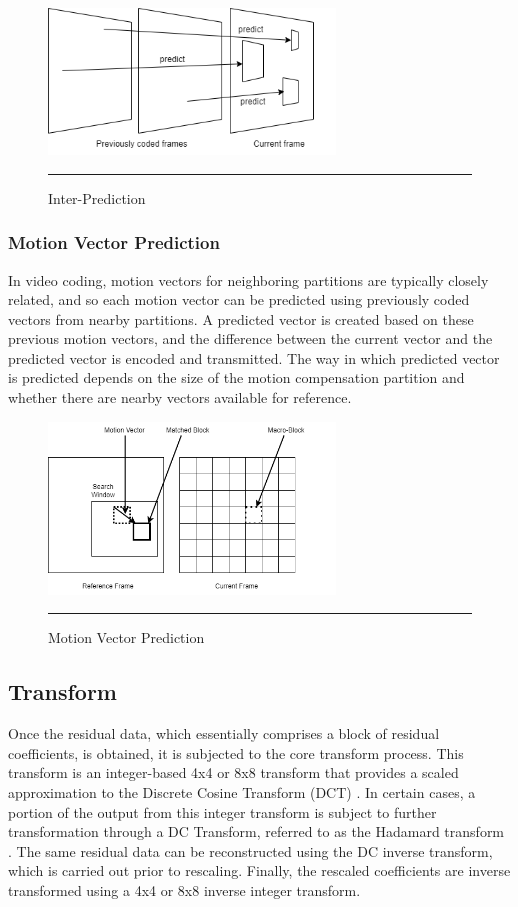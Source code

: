 \begin{figure}[htbp]
	\centering
	\includegraphics[width = 3in]{./Figures/interprediction.png}
	\rule{35em}{0.5pt}
	\caption{Inter-Prediction}
	\label{fig:interprediction}
\end{figure}

\subsubsection{Motion Vector Prediction}
In video coding, motion vectors for neighboring partitions are typically closely related, and so each motion vector can be predicted using previously coded vectors from nearby partitions. A predicted vector is created based on these previous motion vectors, and the difference between the current vector and the predicted vector is encoded and transmitted. The way in which predicted vector is predicted depends on the size of the motion compensation partition and whether there are nearby vectors available for reference.

\begin{figure}[htbp]
	\centering
	\includegraphics[width = 3in]{./Figures/motionvector.png}
	\rule{35em}{0.5pt}
	\caption{Motion Vector Prediction}
	\label{fig:motionvector}
\end{figure}

\subsection{Transform}
Once the residual data, which essentially comprises a block of residual coefficients, is obtained, it is subjected to the core transform process. This transform is an integer-based 4x4 or 8x8 transform that provides a scaled approximation to the Discrete Cosine Transform (DCT) \cite{richardson2010h264}. In certain cases, a portion of the output from this integer transform is subject to further transformation through a DC Transform, referred to as the Hadamard transform \cite{richardson2010h264}. The same residual data can be reconstructed using the DC inverse transform, which is carried out prior to rescaling. Finally, the rescaled coefficients are inverse transformed using a 4x4 or 8x8 inverse integer transform.

